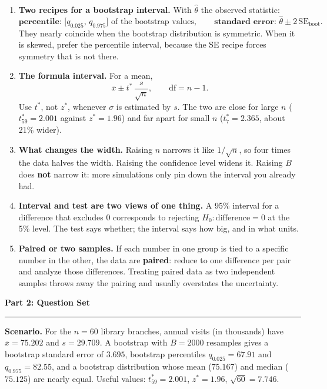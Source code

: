\documentclass[11pt]{article}
\newcommand{\parttitle}[1]{%
  \par\medskip\noindent
  {\large\bfseries #1}\par
  \vspace{-.5em}\noindent\rule{\linewidth}{0.4pt}\par\smallskip}
\begin{document}
{\begin{enumerate}[label=\textbf{\arabic*.}, wide=0pt, itemsep=.45em, topsep=.5em]
\item \textbf{Two recipes for a bootstrap interval.} With $\hat\theta$ the observed statistic:
\[
\textbf{percentile: } \big[q_{0.025},\, q_{0.975}\big] \text{ of the bootstrap values},
\qquad
\textbf{standard error: } \hat\theta \pm 2\,\text{SE}_{\text{boot}} .
\]
They nearly coincide when the bootstrap distribution is symmetric. When it is skewed, prefer the
percentile interval, because the SE recipe forces symmetry that is not there.

\item \textbf{The formula interval.} For a mean,
\[
\bar{x} \pm t^{\ast}\,\frac{s}{\sqrt{n}},
\qquad \text{df} = n-1 .
\]
Use $t^{\ast}$, not $z^{\ast}$, whenever $\sigma$ is estimated by $s$. The two are close for large
$n$ ($t^{\ast}_{59} = 2.001$ against $z^{\ast} = 1.96$) and far apart for small $n$
($t^{\ast}_{7} = 2.365$, about 21\% wider).

\item \textbf{What changes the width.} Raising $n$ narrows it like $1/\sqrt{n}$, so four times the
data halves the width. Raising the confidence level widens it. Raising $B$ does \textbf{not} narrow
it: more simulations only pin down the interval you already had.

\item \textbf{Interval and test are two views of one thing.} A 95\% interval for a difference that
excludes $0$ corresponds to rejecting $H_0: \text{difference} = 0$ at the 5\% level. The test says
whether; the interval says how big, and in what units.

\item \textbf{Paired or two samples.} If each number in one group is tied to a specific number in
the other, the data are \textbf{paired}: reduce to one difference per pair and analyze those
differences. Treating paired data as two independent samples throws away the pairing and usually
overstates the uncertainty.

\end{enumerate}

}

\newpage

\parttitle{Part 2: Question Set}

\noindent\textbf{Scenario.} For the $n = 60$ library branches, annual visits (in thousands) have
$\bar{x} = 75.202$ and $s = 29.709$. A bootstrap with $B = 2000$ resamples gives a bootstrap
standard error of $3.695$, bootstrap percentiles $q_{0.025} = 67.91$ and $q_{0.975} = 82.55$, and a
bootstrap distribution whose mean ($75.167$) and median ($75.125$) are nearly equal. Useful values:
$t^{\ast}_{59} = 2.001$, \; $z^{\ast} = 1.96$, \; $\sqrt{60} = 7.746$.
\end{document}

